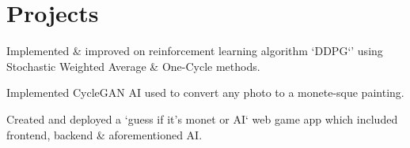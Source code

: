 \documentclass[]{CV}
\begin{document}
\begin{minipage}[t]{0.705\textwidth}
\section{Projects}
\begin{tightemize}

\item Implemented \& improved on reinforcement learning algorithm `DDPG`' using Stochastic Weighted Average \& One-Cycle methods.

\end{tightemize}

\begin{tightemize}

\item Implemented CycleGAN AI used to convert any photo to a monete-sque painting.

\item Created and deployed a `guess if it's monet or AI` web game app which included frontend, backend \& aforementioned AI.

\end{tightemize}
\sectionsep








%
%

\end{minipage} 
\end{document}
